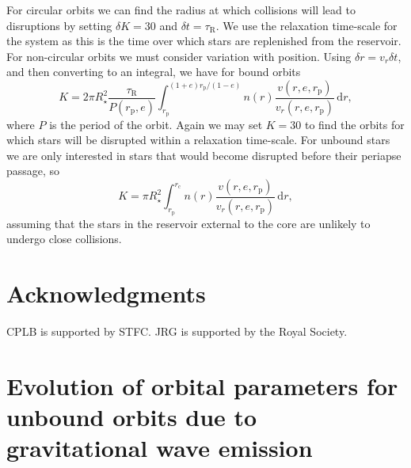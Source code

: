 \documentclass[useAMS,usedcolumn,usegraphicx,usenatbib]{mn2e}
\newcommand{\sub}[1]{\ensuremath{_\mathrm{#1}}}
\newcommand{\dd}{\ensuremath{\mathrm{d}}}
\newcommand{\intd}[4]{\ensuremath{\int_{#1}^{#2}{#3}\,\dd{#4}}}
\begin{document}
For circular orbits we can find the radius at which collisions will lead to disruptions by setting $\delta K = 30$ and $\delta t = \tau\sub{R}$. We use the relaxation time-scale for the system as this is the time over which stars are replenished from the reservoir. For non-circular orbits we must consider variation with position. Using $\delta r = v_r \delta t$, and then converting to an integral, we have for bound orbits
\begin{equation}
K = 2\pi R_\star^2 \frac{\tau\sub{R}}{P(r\sub{p},e)}\intd{r\sub{p}}{(1+e)r\sub{p}/(1-e)}{n(r)\frac{v(r,e,r\sub{p})}{v_r(r,e,r\sub{p})}}{r},
\end{equation}
where $P$ is the period of the orbit. Again we may set $K = 30$ to find the orbits for which stars will be disrupted within a relaxation time-scale. For unbound stars we are only interested in stars that would become disrupted before their periapse passage, so
\begin{equation}
K = \pi R_\star^2 \intd{r\sub{p}}{r\sub{c}}{n(r)\frac{v(r,e,r\sub{p})}{v_r(r,e,r\sub{p})}}{r},
\end{equation}
assuming that the stars in the reservoir external to the core are unlikely to undergo close collisions.


\section*{Acknowledgments}
CPLB is supported by STFC. JRG is supported by the Royal Society.




\appendix

\section[]{Evolution of orbital parameters for unbound orbits due to gravitational wave emission}\label{sec:Unbound}
\end{document}
